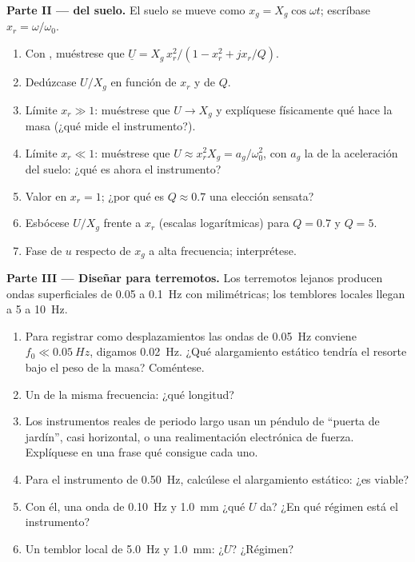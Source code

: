 \begin{problem}
\medskip
\noindent\textbf{Parte II ---  del suelo.}
El suelo se mueve como $x_g = X_g\cos\omega t$; escríbase $x_r = \omega/\omega_0$.
\begin{enumerate}[resume]
  \item Con , muéstrese que $\underline U = X_g\,x_r^2/
        (1 - x_r^2 + jx_r/Q)$.
  \item Dedúzcase $U/X_g$ en función de $x_r$ y de $Q$.
  \item Límite $x_r \gg 1$: muéstrese que $U \to X_g$ y explíquese
        físicamente qué hace la masa (¿qué mide el instrumento?).
  \item Límite $x_r \ll 1$: muéstrese que $U \approx x_r^2X_g = a_g/\omega_0^2$,
        con $a_g$ la  de la aceleración del suelo: ¿qué es ahora
        el instrumento?
  \item Valor en $x_r = 1$; ¿por qué es $Q \approx 0.7$ una elección sensata?
  \item Esbócese $U/X_g$ frente a $x_r$ (escalas logarítmicas) para
        $Q = 0.7$ y $Q = 5$.
  \item Fase de $u$ respecto de $x_g$ a alta frecuencia; interprétese.
\end{enumerate}

\medskip
\noindent\textbf{Parte III --- Diseñar para terremotos.}
Los terremotos lejanos producen ondas superficiales de \qty{0.05}{} a
\qty{0.1}{Hz} con  milimétricas; los temblores locales llegan a \qty{5}{} a \qty{10}{Hz}.
\begin{enumerate}[resume]
  \item Para registrar como desplazamientos las ondas de \qty{0.05}{Hz}
        conviene $f_0 \ll \qty{0.05}{Hz}$, digamos \qty{0.02}{Hz}. ¿Qué
        alargamiento estático tendría el resorte bajo el peso de la masa?
        Coméntese.
  \item Un  de la misma frecuencia: ¿qué longitud?
  \item Los instrumentos reales de periodo largo usan un péndulo de
        ``puerta de jardín'', casi horizontal, o una realimentación
        electrónica de fuerza. Explíquese en una frase qué consigue cada uno.
  \item Para el instrumento de \qty{0.50}{Hz}, calcúlese el alargamiento
        estático: ¿es viable?
  \item Con él, una onda de \qty{0.10}{Hz} y  \qty{1.0}{mm} ¿qué
        $U$ da? ¿En qué régimen está el instrumento?
  \item Un temblor local de \qty{5.0}{Hz} y  \qty{1.0}{mm}: ¿$U$?
        ¿Régimen?
\end{enumerate}


\end{problem}
